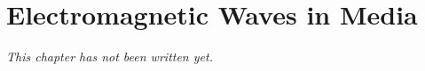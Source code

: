 \chapter{Electromagnetic Waves in Media}\label{ch:b2:waves-in-media}


\emph{This chapter has not been written yet.}
